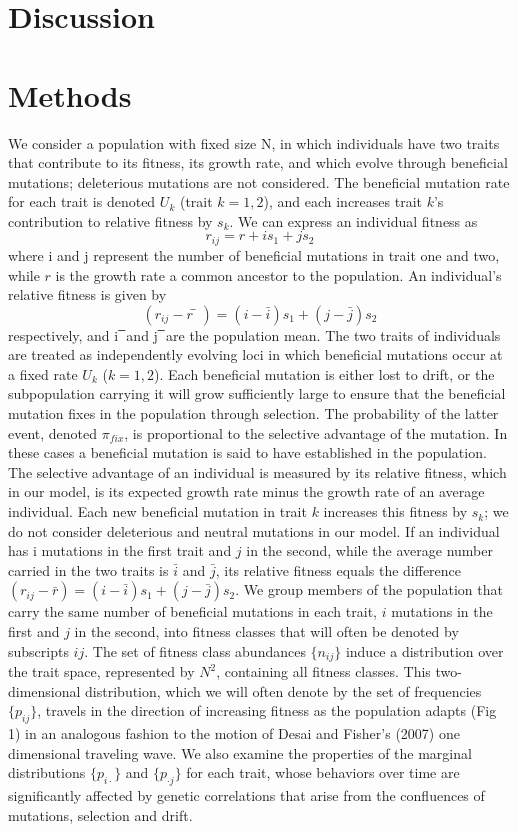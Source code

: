 \documentclass[11pt,one column]{article}
\begin{document}
\begin{multicols}{2}
\section*{Discussion}
\section*{Methods}
We consider a population with fixed size N, in which individuals have two traits that contribute to its fitness, its growth rate, and which evolve through beneficial mutations; deleterious mutations are not considered.  The beneficial mutation rate for each trait is denoted $U_k$ (trait $k=1,2$), and each increases trait $k$’s contribution to relative fitness by $s_k$.  We can express an individual fitness as 
\[ r_{ij}=r+i s_1+j s_2 \]
where i and j represent the number of beneficial mutations in trait one and two, while $r$ is the growth rate a common ancestor to the population. 
An individual’s relative fitness is given by
\[ (r_{ij}-r ̅)=(i-\bar{i} ) s_1+(j-\bar{j} ) s_2 \]
respectively, and i ̅ and j ̅ are the population mean.  The two traits of individuals are treated as independently evolving loci in which beneficial mutations occur at a fixed rate $U_k$ ($k=1,2$).  Each beneficial mutation is either lost to drift, or the subpopulation carrying it will grow sufficiently large to ensure that the beneficial mutation fixes in the population through selection. The probability of the latter event, denoted $\pi_{fix}$, is proportional to the selective advantage of the mutation. In these cases a beneficial mutation is said to have established in the population. The selective advantage of an individual is measured by its relative fitness, which in our model, is its expected growth rate minus the growth rate of an average individual. Each new beneficial mutation in trait $k$ increases this fitness by $s_k$; we do not consider deleterious and neutral mutations in our model. If an individual has i mutations in the first trait and $j$ in the second, while the average number carried in the two traits is $\bar{i}$ and $\bar{j}$, its relative fitness equals the difference $(r_{ij}-\bar{r})=(i-\bar{i}) s_1+(j-\bar{j}) s_2$. We group members of the population that carry the same number of beneficial mutations in each trait, $i$ mutations in the first and $j$ in the second, into fitness classes that will often be denoted by subscripts $ij$. The set of fitness class abundances $\{n_{ij} \}$ induce a distribution over the trait space, represented by $N^2$, containing all fitness classes. This two-dimensional distribution, which we will often denote by the set of frequencies $\{p_{ij}\}$, travels in the direction of increasing fitness as the population adapts (Fig 1) in an analogous fashion to the motion of Desai and Fisher’s (2007) one dimensional traveling wave. We also examine the properties of the marginal distributions $\{p_{i\cdot}\}$ and $\{p_{\cdot j}\}$ for each trait, whose behaviors over time are significantly affected by genetic correlations that arise from the confluences of mutations, selection and drift.

\end{multicols}
\end{document}
